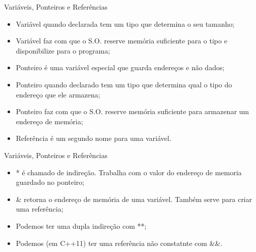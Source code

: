 \documentclass[12pt,table,xcolor={dvipsnames}]{beamer}
\begin{document}
\begin{frame}[fragile]{Variáveis, Ponteiros e Referências}
\begin{itemize}
\item Variável quando declarada tem um tipo que determina o seu tamanho;
\item Variável faz com que o S.O. reserve memória suficiente para o tipo e disponibilize para o programa;
\item Ponteiro é uma variável especial que guarda endereços e não dados;
\item Ponteiro quando declarado tem um tipo que determina qual o tipo do endereço que ele armazena;
\item Ponteiro faz com que o S.O. reserve memória suficiente para armazenar um endereço de memória;
\item Referência é um segundo nome para uma variável.
\end{itemize}
\end{frame}

\begin{frame}[fragile]{Variáveis, Ponteiros e Referências}
\begin{itemize}
\item * é chamado de indireção. Trabalha com o valor do endereço de memoria guardado no ponteiro;
\item \& retorna o endereço de memória de uma variável. Também serve para criar uma referência;
\item Podemos ter uma dupla indireção com **;
\item Podemos (em C++11) ter uma referência não constatnte com \&\&.
\end{itemize}
\end{frame}
\end{document}
